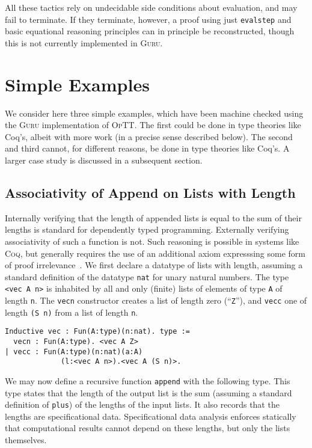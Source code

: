 \documentclass[preprint,natbib]{sigplanconf}
\newcommand{\optt}{\textsc{OpTT}}
\begin{document}
All these tactics rely on undecidable side conditions about
evaluation, and may fail to terminate.  If they terminate, however, a
proof using just \texttt{evalstep} and basic equational reasoning
principles can in principle be reconstructed, though this is not
currently implemented in \textsc{Guru}.  

\section{Simple Examples}
\label{sec:eg}

We consider here three simple examples, which have been machine
checked using the \textsc{Guru} implementation of \optt.  The first
could be done in type theories like Coq's, albeit with more work (in a
precise sense described below).  The second and third cannot, for
different reasons, be done in type theories like Coq's.  A larger case
study is discussed in a subsequent section.

\subsection{Associativity of Append on Lists with Length}

Internally verifying that the length of appended lists is equal to the
sum of their lengths is standard for dependently typed programming.
Externally verifying associativity of such a function is not.  Such
reasoning is possible in systems like \textsc{Coq}, but generally
requires the use of an additional axiom expresssing some form of proof
irrelevance~\cite{hofmann+98,coq}.  We first declare a datatype of
lists with length, assuming a standard definition of the datatype
\texttt{nat} for unary natural numbers.  The type \texttt{<vec A n>}
is inhabited by all and only (finite) lists of elements of type
\texttt{A} of length \texttt{n}.  The \texttt{vecn} constructor
creates a list of length zero (``\texttt{Z}''), and \texttt{vecc} one
of length \texttt{(S n)} from a list of length \texttt{n}.

\begin{verbatim}
Inductive vec : Fun(A:type)(n:nat). type :=
  vecn : Fun(A:type). <vec A Z>
| vecc : Fun(A:type)(n:nat)(a:A)
             (l:<vec A n>).<vec A (S n)>.
\end{verbatim}

\noindent
We may now define a recursive function \texttt{append} with the
following type.  This type states that the length of the output list
is the sum (assuming a standard definition of \texttt{plus}) of the
lengths of the input lists.  It also records that the lengths are
specificational data.  Specificational data analysis enforces
statically that computational results cannot depend on these
lengths, but only the lists themselves.
\end{document}
